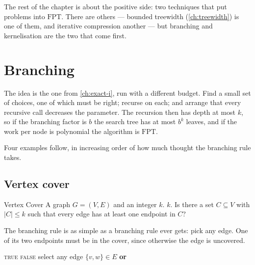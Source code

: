 The rest of the chapter is about the positive side: two techniques that put
problems into $\mathrm{FPT}$. There are others --- bounded treewidth
(\cref{ch:treewidth}) is one of them, and iterative compression another --- but
branching and kernelisation are the two that come first.

\section{Branching}
\label{sec:fpt-branching}

The idea is the one from \cref{ch:exact-i}, run with a different budget. Find a
small set of choices, one of which must be right; recurse on each; and arrange
that every recursive call decreases the parameter. The recursion then has depth
at most $k$, so if the branching factor is $b$ the search tree has at most $b^k$
leaves, and if the work per node is polynomial the algorithm is $\mathrm{FPT}$.

Four examples follow, in increasing order of how much thought the branching rule
takes.

\subsection{Vertex cover}

\begin{probdef}{Vertex Cover}
  \instance A graph $G = (V,E)$ and an integer $k$.
  \parameter $k$.
  \question Is there a set $C \subseteq V$ with $|C| \le k$ such that every edge
  has at least one endpoint in $C$?
\end{probdef}

The branching rule is as simple as a branching rule ever gets: pick any edge.
One of its two endpoints must be in the cover, since otherwise the edge is
uncovered.

\begin{algorithm}[ht]
\caption{Branching for }
\label{alg:fpt-vc}
\begin{algorithmic}[1]
     \Return \textsc{true} \EndIf
     \Return \textsc{false} \EndIf
    \State select any edge $\{v,w\} \in E$
    \State \Return {} \textbf{ or }
  \EndFunction
\end{algorithmic}
\end{algorithm}

